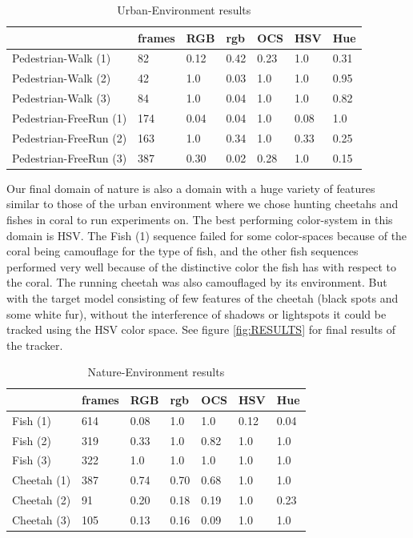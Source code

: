 \documentclass[a4paper,11pt]{article}
\begin{document}
		\begin{table}[H]
			\centering
			\begin{tabular}{ | l | l | l | l | l | l | l |}
			\hline
			                     & frames & RGB & rgb & OCS & HSV & Hue \\
			\hline
			Pedestrian-Walk    (1)&  82 & 0.12 & 0.42 & 0.23 & 1.0  & 0.31 \\
			Pedestrian-Walk    (2)&  42 & 1.0  & 0.03 & 1.0  & 1.0  & 0.95 \\
			Pedestrian-Walk    (3)&  84 & 1.0  & 0.04 & 1.0  & 1.0  & 0.82 \\
			Pedestrian-FreeRun (1)& 174 & 0.04 & 0.04 & 1.0  & 0.08 & 1.0  \\
			Pedestrian-FreeRun (2)& 163 & 1.0  & 0.34 & 1.0  & 0.33 & 0.25 \\
			Pedestrian-FreeRun (3)& 387 & 0.30 & 0.02 & 0.28 & 1.0 & 0.15 \\
			\hline
			\end{tabular}
			\caption{Urban-Environment results}
			\label{table:ped}
		\end{table}
		\noindent
		Our final domain of nature is also a domain with a huge variety of features similar to
		those of the urban environment where we chose hunting cheetahs and fishes in coral to
		run experiments on. The best performing color-system in this domain is HSV. The Fish (1)
		sequence failed for some color-spaces because of the coral being camouflage for the type
		of fish, and the other fish sequences performed very well because of the distinctive color
		the fish has with respect to the coral. The running cheetah was also camouflaged by its environment. But with the target model consisting of few features of the cheetah (black spots and some white fur),		without the interference of shadows or lightspots it could be tracked using the HSV color space. See figure \ref{fig:RESULTS} for final results of the tracker. 
		\begin{table}[H]
			\centering
			\begin{tabular}{ | l | l | l | l | l | l | l |}
			\hline
			           & frames & RGB & rgb & OCS & HSV & Hue \\
			\hline
			Fish    (1)& 614   & 0.08 & 1.0  & 1.0  & 0.12 & 0.04 \\
			Fish    (2)& 319   & 0.33 & 1.0  & 0.82 & 1.0  & 1.0 \\
			Fish    (3)& 322   & 1.0  & 1.0  & 1.0  & 1.0  & 1.0 \\
			Cheetah (1)& 387   & 0.74 & 0.70 & 0.68 & 1.0  & 1.0 \\
			Cheetah (2)&  91   & 0.20 & 0.18 & 0.19 & 1.0  & 0.23 \\
			Cheetah (3)& 105   & 0.13 & 0.16 & 0.09 & 1.0  & 1.0 \\
			\hline
			\end{tabular}
			\caption{Nature-Environment results}
			\label{table:an}
		\end{table}
\end{document}
